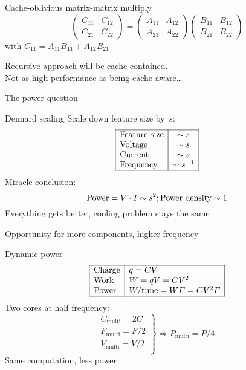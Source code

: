 \begin{frame}{Cache-oblivious matrix-matrix multiply}
  \[ 
  \begin{pmatrix}
    C_{11}&C_{12}\\ C_{21}&C_{22}
  \end{pmatrix}
  =
  \begin{pmatrix}
    A_{11}&A_{12}\\ A_{21}&A_{22}
  \end{pmatrix}
  \begin{pmatrix}
    B_{11}&B_{12}\\ B_{21}&B_{22}
  \end{pmatrix}
  \]
  with $C_{11}=A_{11}B_{11}+A_{12}B_{21}$

  Recursive approach will be cache contained.\\
  Not as high performance as being cache-aware\ldots  
\end{frame}

 {The power question}

\begin{frame}{Dennard scaling}
Scale down feature size by~$s$:
\[
\begin{array}{|l|c|}\hline
\hbox{Feature size}&\sim s\\
\hbox{Voltage}&\sim s\\
\hbox{Current}&\sim s \\ 
\hbox{Frequency}&\sim s^{-1}\\
\hline
\end{array}
\]  
Miracle conclusion:
\[ \hbox{Power} = V\cdot I \sim s^2; \hbox{Power density}\sim 1 \]
Everything gets better, cooling problem stays the same

Opportunity for more components, higher frequency
\end{frame}

\begin{frame}{Dynamic power}
\begin{equation}
\begin{array}{|l|l|} \hline
\hbox{Charge}&q=CV\\
\hbox{Work}&W=qV=CV^2\\
\hbox{Power}&W/\hbox{time}=WF=CV^2F \\ \hline
\end{array}
\label{eq:power}
\end{equation}  
Two cores at half frequency:
\[ \left.
\begin{array}{c}
C_{\mathrm{multi}} = 2C\\
F_{\mathrm{multi}} = F/2\\
V_{\mathrm{multi}} = V/2\\
\end{array}\right\} \Rightarrow
P_{\mathrm{multi}} = P/4.
\]
Same computation, less power
\end{frame}

